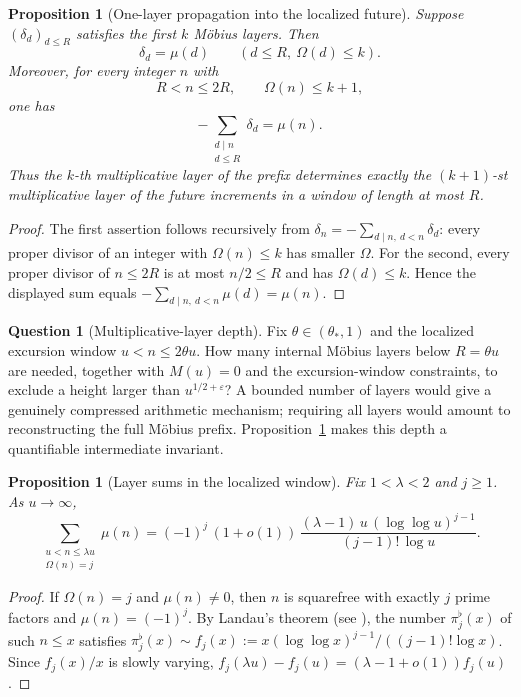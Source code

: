 \documentclass[11pt]{amsart}
\numberwithin{equation}{section}
\theoremstyle{plain}
\newtheorem{proposition}[theorem]{Proposition}
\theoremstyle{definition}
\newtheorem{question}[theorem]{Question}
\theoremstyle{remark}
\newcommand{\eps}{\varepsilon}
\begin{document}
\begin{proposition}[One-layer propagation into the localized future]
\label{prop:layer-propagation}
Suppose $(\delta_d)_{d\le R}$ satisfies the first $k$ M\"obius layers. Then
\[
\delta_d=\mu(d)\qquad(d\le R,\ \Omega(d)\le k).
\]
Moreover, for every integer $n$ with
\[
R<n\le2R,\qquad\Omega(n)\le k+1,
\]
one has
\[
-\sum_{\substack{d\mid n\\d\le R}}\delta_d=\mu(n).
\]
Thus the $k$-th multiplicative layer of the prefix determines exactly the
$(k+1)$-st multiplicative layer of the future increments in a window of
length at most $R$.
\end{proposition}

\begin{proof}
The first assertion follows recursively from
$\delta_n=-\sum_{d\mid n,\ d<n}\delta_d$: every proper divisor of an
integer with $\Omega(n)\le k$ has smaller $\Omega$.  For the second, every
proper divisor of $n\le2R$ is at most $n/2\le R$ and has
$\Omega(d)\le k$.  Hence the displayed sum equals
$-\sum_{d\mid n,\ d<n}\mu(d)=\mu(n)$.
\end{proof}

\begin{question}[Multiplicative-layer depth]
\label{q:layer-depth}
Fix $\theta\in(\theta_*,1)$ and the localized excursion window
$u<n\le2\theta u$.  How many internal M\"obius layers below
$R=\theta u$ are needed, together with $M(u)=0$ and the excursion-window
constraints, to exclude a height larger than $u^{1/2+\eps}$?  A bounded
number of layers would give a genuinely compressed arithmetic mechanism;
requiring all layers would amount to reconstructing the full M\"obius
prefix.  Proposition~\ref{prop:layer-propagation} makes this depth a
quantifiable intermediate invariant.
\end{question}
\begin{proposition}[Layer sums in the localized window]
\label{prop:layer-sums}
Fix $1<\lambda<2$ and $j\ge1$. As $u\to\infty$,
\begin{equation}
\label{eq:layer-sum}
\sum_{\substack{u<n\le\lambda u\\ \Omega(n)=j}}\mu(n)
=(-1)^j\,(1+o(1))\,\frac{(\lambda-1)\,u\,(\log\log u)^{j-1}}{(j-1)!\,\log u}.
\end{equation}
\end{proposition}

\begin{proof}
If $\Omega(n)=j$ and $\mu(n)\ne0$, then $n$ is squarefree with exactly $j$
prime factors and $\mu(n)=(-1)^j$. By Landau's theorem (see
\cite[Ch.~7]{MontgomeryVaughan2007}), the number $\pi_j^\flat(x)$ of such
$n\le x$ satisfies $\pi_j^\flat(x)\sim f_j(x):=x(\log\log x)^{j-1}/((j-1)!\log x)$.
Since $f_j(x)/x$ is slowly varying, $f_j(\lambda u)-f_j(u)=(\lambda-1+o(1))f_j(u)$.
\end{proof}
\end{document}
